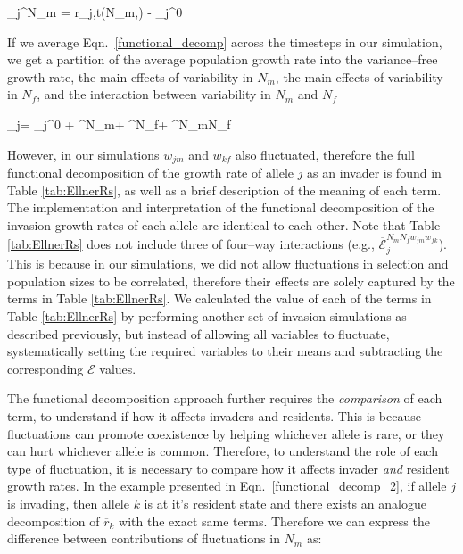 \documentclass[12pt]{article}
\let\oldequation\equation
\let\oldendequation\endequation
\renewenvironment{equation}
  {\linenomathNonumbers\oldequation}
  {\oldendequation\endlinenomath}
\begin{document}
\begin{equation}
  _{j}^{N_{m}} = r_{j,t}(N_{m},) - _{j}^{0}
\end{equation}

If we average Eqn.~\ref{functional_decomp} across the timesteps in our simulation, we get a partition of the average population growth rate into the variance--free growth rate, the main effects of variability in $N_{m}$, the main effects of variability in $N_{f}$, and the interaction between variability in $N_{m}$ and $N_{f}$

\begin{equation}
    _{j}= _{j}^{0} + ^{N_{m}}+ ^{N_{f}}+ ^{N_{m}N_{f}}
   \label{functional_decomp_2}
\end{equation}

 However, in our simulations $w_{jm}$ and $w_{kf}$ also fluctuated, therefore the full functional decomposition of the growth rate of allele $j$ as an invader is found in Table \ref{tab:EllnerRs}, as well as a brief description of the meaning of each term. The implementation and interpretation of the functional decomposition of the invasion growth rates of each allele are identical to each other. Note that Table \ref{tab:EllnerRs} does not include three of four--way interactions (e.g., $\overline{\mathcal{E}}^{N_{m}N_{f}w_{jm}w_{fk}}_{j}$). This is because in our simulations, we did not allow fluctuations in selection and population sizes to be correlated, therefore their effects are solely captured by the terms in Table \ref{tab:EllnerRs}. We calculated the value of each of the terms in Table \ref{tab:EllnerRs} by performing another set of invasion simulations as described previously, but instead of allowing all variables to fluctuate, systematically setting the required variables to their means and subtracting the corresponding $\mathcal{E}$ values.


The functional decomposition approach further requires the \textit{comparison} of each term, to understand if how it affects invaders and residents. This is because fluctuations can promote coexistence by helping whichever allele is rare, or they can hurt whichever allele is common. Therefore, to understand the role of each type of fluctuation, it is necessary to compare how it affects invader \textit{and} resident growth rates. In the example presented in Eqn.~\ref{functional_decomp_2}, if allele $j$ is invading, then allele $k$ is at it's resident state and there exists an analogue decomposition of $\overline{r}_{k}$ with the exact same terms. Therefore we can express the difference between contributions of fluctuations in $N_{m}$ as:
\end{document}

